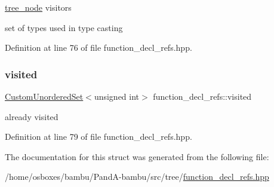 \hyperlink{classtree__node}{tree\+\_\+node} visitors 

set of types used in type casting 

Definition at line 76 of file function\+\_\+decl\+\_\+refs.\+hpp.

\mbox{\label{structfunction__decl__refs_a6e191e3ba80237e8b2ad60f8f86637a4}} 
\subsubsection{\texorpdfstring{visited}{visited}}
{\footnotesize\ttfamily \hyperlink{classCustomUnorderedSet}{Custom\+Unordered\+Set}$<$unsigned int$>$ function\+\_\+decl\+\_\+refs\+::visited\hspace{0.3cm}{\ttfamily [private]}}



already visited 



Definition at line 79 of file function\+\_\+decl\+\_\+refs.\+hpp.



The documentation for this struct was generated from the following file\+:\begin{DoxyCompactItemize}
\item 
/home/osboxes/bambu/\+Pand\+A-\/bambu/src/tree/\hyperlink{function__decl__refs_8hpp}{function\+\_\+decl\+\_\+refs.\+hpp}\end{DoxyCompactItemize}
